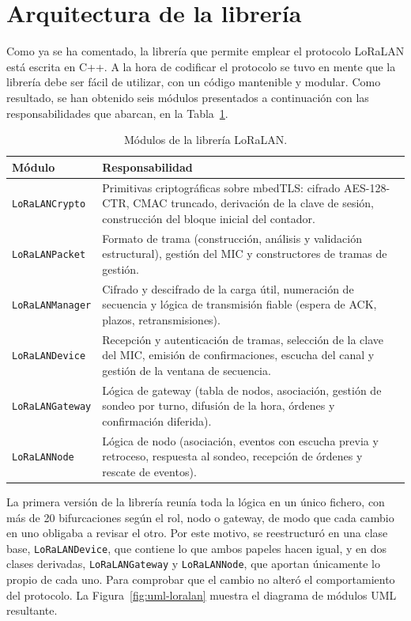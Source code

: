 \section{Arquitectura de la librería}

Como ya se ha comentado, la librería que permite emplear el protocolo LoRaLAN está escrita en C++. A la hora de codificar el protocolo se tuvo en mente que la librería debe ser fácil de utilizar, con un código mantenible y modular. Como resultado, se han obtenido seis módulos presentados a continuación con las responsabilidades que abarcan, en la Tabla~\ref{tab:modulos}.

\begin{table}[H]
\centering
\caption{\label{tab:modulos} Módulos de la librería LoRaLAN.}
\begin{tabular}{|p{3.4cm}|p{10.4cm}|}
\hline
\textbf{Módulo} & \textbf{Responsabilidad} \\
\hline
\texttt{LoRaLANCrypto} & Primitivas criptográficas sobre mbedTLS: cifrado AES-128-CTR, CMAC truncado, derivación de la clave de sesión, construcción del bloque inicial del contador. \\
\hline
\texttt{LoRaLANPacket} & Formato de trama (construcción, análisis y validación estructural), gestión del MIC y constructores de tramas de gestión. \\
\hline
\texttt{LoRaLANManager} & Cifrado y descifrado de la carga útil, numeración de secuencia y lógica de transmisión fiable (espera de ACK, plazos, retransmisiones). \\
\hline
\texttt{LoRaLANDevice} & Recepción y autenticación de tramas, selección de la clave del MIC, emisión de confirmaciones, escucha del canal y gestión de la ventana de secuencia. \\
\hline
\texttt{LoRaLANGateway} & Lógica de gateway (tabla de nodos, asociación, gestión de sondeo por turno, difusión de la hora, órdenes y confirmación diferida). \\
\hline
\texttt{LoRaLANNode} & Lógica de nodo (asociación, eventos con escucha previa y retroceso, respuesta al sondeo, recepción de órdenes y rescate de eventos). \\
\hline
\end{tabular}
\end{table}

La primera versión de la librería reunía toda la lógica en un único fichero, con más de 20 bifurcaciones según el rol, nodo o gateway, de modo que cada cambio en uno obligaba a revisar el otro. Por este motivo, se reestructuró en una clase base, \texttt{LoRaLANDevice}, que contiene lo que ambos papeles hacen igual, y en dos clases derivadas, \texttt{LoRaLANGateway} y \texttt{LoRaLANNode}, que aportan únicamente lo propio de cada uno. Para comprobar que el cambio no alteró el comportamiento del protocolo.
La Figura~\ref{fig:uml-loralan} muestra el diagrama de módulos UML resultante.

